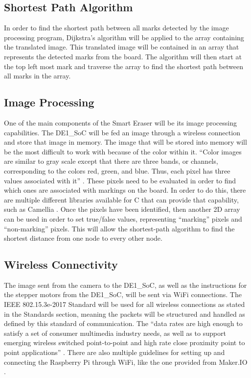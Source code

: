 \subsection{Shortest Path Algorithm}
In order to find the shortest path between all marks detected by the image processing program, Dijkstra's algorithm will be applied to the array containing the translated image. This translated image will be contained in an array that represents the detected marks from the board. The algorithm will then start at the top left most mark and traverse the array to find the shortest path between all marks in the array.\par

\subsection{Image Processing}
One of the main components of the Smart Eraser will be its image processing capabilities. The DE1\_SoC will be fed an image through a wireless connection and store that image in memory. The image that will be stored into memory will be the most difficult to work with because of the color within it. ``Color images are similar to gray scale except that there are three bands, or channels, corresponding to the colors red, green, and blue.  Thus, each pixel has three values associated with it'' \cite{improc1}. These pixels need to be evaluated in order to find which ones are associated with markings on the board. In order to do this, there are multiple different libraries available for C that can provide that capability, such as Camellia \cite{camellia}. Once the pixels have been identified, then another 2D array can be used in order to set true/false values, representing ``marking'' pixels and ``non-marking'' pixels. This will allow the shortest-path algorithm to find the shortest distance from one node to every other node.  

\subsection{Wireless Connectivity}
The image sent from the camera to the DE1\_SoC, as well as the instructions for the stepper motors from the DE1\_SoC, will be sent via WiFi connections. The IEEE 802.15.3e-2017 Standard will be used for all wireless connections as stated in the Standards section, meaning the packets will be structured and handled as defined by this standard of communication. The ``data rates are high enough to satisfy a set of consumer multimedia industry needs, as well as to support emerging wireless switched point-to-point and high rate close proximity point to point applications'' \cite{wifiStandards}. There are also multiple guidelines for setting up and connecting the Raspberry Pi through WiFi, like the one provided from Maker.IO \cite{maker}.

